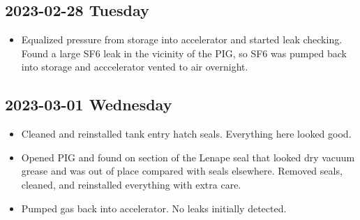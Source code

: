 \documentclass{scrartcl}
\begin{document}
\subsection{2023-02-28 Tuesday}
\begin{itemize}
	\item Equalized pressure from storage into accelerator and started
	leak checking.  Found a large SF6 leak in the vicinity of the PIG, 
	so SF6 was pumped back into storage and acccelerator vented to air
	overnight.
\end{itemize}

\subsection{2023-03-01 Wednesday}
\begin{itemize}
	\item Cleaned and reinstalled tank entry hatch seals. Everything
	here looked good.
	\item Opened PIG and found on section of the Lenape seal that looked
	dry vacuum grease and was out of place compared with seals elsewhere.
	Removed seals, cleaned, and reinstalled everything with extra care.
	\item Pumped gas back into accelerator.  No leaks initially detected.
\end{itemize}
\end{document}
